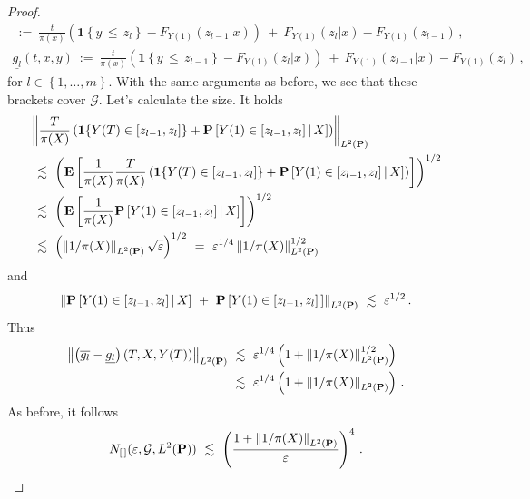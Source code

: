 \begin{proof}
\begin{align*}
    \ 
    :=
    \ 
    \frac{t}{\pi(x)}
    \left( 
      \mathbf{1}{\left\{  y\,\le\,z_{l} \right\}}
      -
      F_{Y(1)}(z_{l-1}|x)
    \right)
    \ 
    +
    \ 
    F_{Y(1)}(z_{l}|x)
-
F_{Y(1)}(z_{l-1})
\,,
\\
    \underline{g_l}
    (t,x,y)
    \ 
    :=
    \ 
    \frac{t}{\pi(x)}
    \left( 
      \mathbf{1}{\left\{  y\,\le\,z_{l-1} \right\}}
      -
      F_{Y(1)}(z_l|x)
    \right)
    \ 
    +
    \ 
    F_{Y(1)}(z_{l-1}|x)
-
      F_{Y(1)}(z_l)
\,,
  \end{align*}
  for $l\in \left\{ 1,\ldots,m \right\}$.
  With the same arguments as before, we see that these brackets cover $\mathcal{G}$.
  Let's calculate the size.
  It holds
  \begin{align*}
    &
    \norm{
      \frac{T}{\pi(X)}
      \left( 
      \mathbf{1}{
      \left\{ 
      Y(T)\in [z_{l-1},z_l] 
    \right\}
    }
      +
      \P
      \left[ 
      Y(1)\in [z_{l-1},z_l] 
      \,
      |
      \,
      X
      \right]
      \right)
    }_{ L^2(\P)}
    \\
    &
    \
    \lesssim
    \
    \left( 
      \E
      \left[ 
        \frac{1}{\pi(X)}
        \frac{T}{\pi(X)}
      \left( 
      \mathbf{1}{
      \left\{ 
      Y(T)\in [z_{l-1},z_l] 
    \right\}
    }
      +
      \P
      \left[ 
      Y(1)\in [z_{l-1},z_l] 
      \,
      |
      \,
      X
      \right]
      \right)
      \right]
    \right)
    ^{1/2}
    \\
    &
    \
    \lesssim
    \
    \left( 
      \E
      \left[ 
        \frac{1}{\pi(X)}
      \P
      \left[ 
      Y(1)\in [z_{l-1},z_l] 
      \,
      |
      \,
      X
      \right]
      \right]
    \right)
    ^{1/2}
    \\
    &
    \ 
    \lesssim
    \ 
    \left( 
      \norm{1/\pi(X)}_{ L^2(\P)}
      \sqrt{\varepsilon}
    \right)
    ^{1/2}
    \ 
    =
    \ 
    \varepsilon^{1/4}
    \norm{1/\pi(X)}_{ L^2(\P)}^{1/2}
  \end{align*}
  and
  \begin{align*}
     \norm{
      \P
      \left[ 
      Y(1)\in [z_{l-1},z_l] 
      \,
      |
      \,
      X
      \right]
      \ 
     + 
      \ 
      \P
      \left[ 
      Y(1)\in [z_{l-1},z_l] \,
      \right]
    }_{ L^2(\P)}
    \ 
    \lesssim
    \ 
    \varepsilon^{1/2}
    \,.
  \end{align*}
  Thus
  \begin{align*}
  \norm{
    \left( 
  \overline{g_l}
-
  \underline{g_l}
    \right)
  (T,X,Y(T))
}_
{ L^2(\P)}
    &
\ 
\lesssim
\ 
\varepsilon^{1/4}
\left( 
  1
  +
    \norm{1/\pi(X)}_{ L^2(\P)}^{1/2}
\right)
\\
    &
\ 
\lesssim
\ 
\varepsilon^{1/4}
\left( 
  1
  +
    \norm{1/\pi(X)}_{ L^2(\P)}
\right)
\,.
  \end{align*}
As before, it follows
\begin{gather*}
    N_{[\,]}
    (
    \varepsilon
    ,
    \mathcal{G}, L^2(\P))
    \ 
    \lesssim
    \ 
    \left( 
    \frac{
      1+
    \norm{1/\pi(X)}_{ L^2(\P)}
    }
    {\varepsilon}
    \right)^4
    \,.
\end{gather*}
\end{proof}
